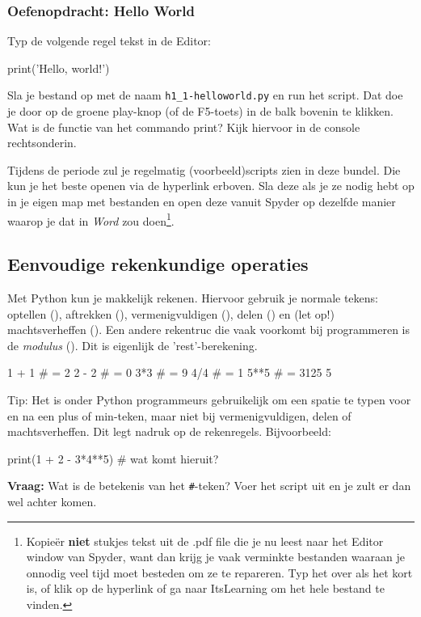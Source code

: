 \documentclass[a4paper,11pt, fleqn]{article}
\begin{document}
\subsubsection*{Oefenopdracht: Hello World} 
Typ de volgende regel tekst in de Editor: 
\begin{python}
print('Hello, world!')
\end{python}
Sla je bestand op met de naam \verb,h1_1-helloworld.py, en run het script.  Dat doe je door op de groene play-knop (of de F5-toets) in de balk bovenin te klikken.
Wat is de functie van het commando print? Kijk hiervoor in de console rechtsonderin.

Tijdens de periode zul je regelmatig (voorbeeld)scripts zien in deze bundel. Die kun je het beste openen via de hyperlink erboven. 
Sla deze als je ze nodig hebt op in je eigen map met bestanden en open deze vanuit Spyder op dezelfde manier waarop je dat in \textit{Word} zou doen\footnote{Kopie\"{e}r \textbf{niet} stukjes tekst uit de .pdf file die je nu leest naar het Editor window van Spyder, want dan krijg je vaak verminkte bestanden waaraan je onnodig veel tijd moet besteden om ze te repareren. Typ het over als het kort is, of klik op de hyperlink of ga naar ItsLearning om het hele bestand te vinden.}.

\subsection{Eenvoudige rekenkundige operaties}
Met Python kun je makkelijk rekenen. Hiervoor gebruik je normale tekens: optellen (\pythoninline{+}), aftrekken (\pythoninline{-}), vermenigvuldigen (\pythoninline{*}), delen (\pythoninline{/}) en (let op!) machtsverheffen (\pythoninline{**}). Een andere rekentruc die vaak voorkomt bij programmeren is de \textit{modulus} (\pythoninline{\%}). Dit is eigenlijk de 'rest'-berekening.

\begin{python}
1 + 1 # = 2
2 - 2 # = 0
3*3   # = 9
4/4   # = 1
5**5  # = 3125
5 %
\end{python}

Tip: Het is onder Python programmeurs gebruikelijk om een spatie te typen voor en na een plus of min-teken, maar niet bij vermenigvuldigen, delen of machtsverheffen. Dit legt nadruk op de rekenregels. Bijvoorbeeld: 

\begin{python}
print(1 + 2 - 3*4**5) # wat komt hieruit?
\end{python}
\textbf{Vraag:} Wat is de betekenis van het \verb,#,-teken? Voer het script uit en je zult er dan wel achter komen. 
\end{document}
